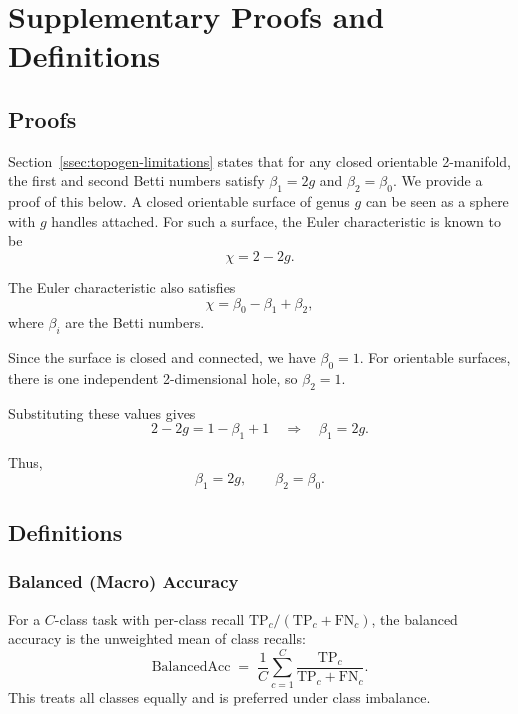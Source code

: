 \section{Supplementary Proofs and Definitions}
\label{sec:suppl-definitions}

\subsection{Proofs}
\label{ssec:suppl-proofs}

Section~\ref{ssec:topogen-limitations} states that for any closed orientable 2-manifold, the first and second Betti numbers satisfy $\beta_1 = 2g$ and $\beta_2 = \beta_0$. We provide a proof of this below.
\noindent
A closed orientable surface of genus $g$ can be seen as a sphere with $g$ handles attached. 
For such a surface, the Euler characteristic is known to be
\begin{equation}
\chi = 2 - 2g.
\end{equation}

The Euler characteristic also satisfies
\begin{equation}
\chi = \beta_0 - \beta_1 + \beta_2,
\end{equation}
where $\beta_i$ are the Betti numbers.

Since the surface is closed and connected, we have $\beta_0 = 1$. 
For orientable surfaces, there is one independent 2-dimensional hole, so $\beta_2 = 1$.

Substituting these values gives
\begin{equation}
2 - 2g = 1 - \beta_1 + 1 \quad \Rightarrow \quad \beta_1 = 2g.
\end{equation}

Thus,
\begin{equation}
\beta_1 = 2g, \qquad \beta_2 = \beta_0.
\end{equation}


\subsection{Definitions}
\label{ssec:suppl-defs}

\subsubsection{Balanced (Macro) Accuracy}
For a $C$-class task with per-class recall $\mathrm{TP}_c/(\mathrm{TP}_c+\mathrm{FN}_c)$, the balanced accuracy is the unweighted mean of class recalls:
\begin{equation}
\mathrm{BalancedAcc} \;=\; \frac{1}{C} \sum_{c=1}^{C} \frac{\mathrm{TP}_c}{\mathrm{TP}_c + \mathrm{FN}_c}.
\end{equation}
This treats all classes equally and is preferred under class imbalance.

